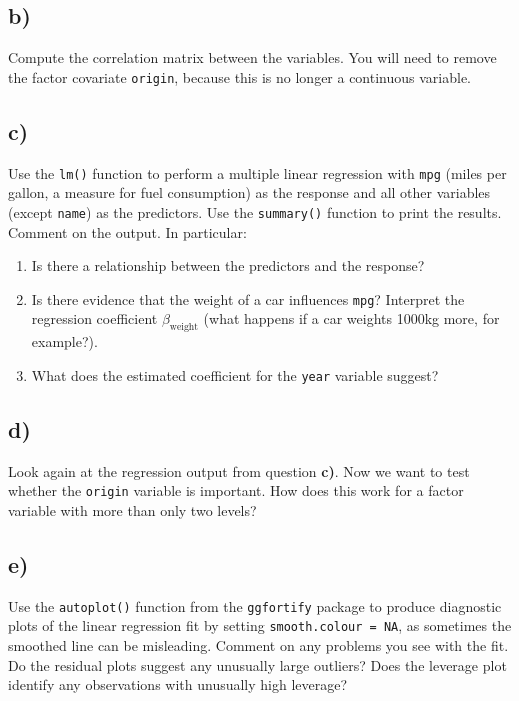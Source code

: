 \documentclass[
]{article}
\begin{document}
\subsection{b)}\label{b}

Compute the correlation matrix between the variables. You will need to
remove the factor covariate \texttt{origin}, because this is no longer a
continuous variable.

\subsection{c)}\label{c}

Use the \texttt{lm()} function to perform a multiple linear regression
with \texttt{mpg} (miles per gallon, a measure for fuel consumption) as
the response and all other variables (except \texttt{name}) as the
predictors. Use the \texttt{summary()} function to print the results.
Comment on the output. In particular:

\begin{enumerate}
\def\labelenumi{\roman{enumi}.}
\item
  Is there a relationship between the predictors and the response?
\item
  Is there evidence that the weight of a car influences \texttt{mpg}?
  Interpret the regression coefficient \(\beta_{\text{weight}}\) (what
  happens if a car weights 1000kg more, for example?).
\item
  What does the estimated coefficient for the \texttt{year} variable
  suggest?
\end{enumerate}

\subsection{d)}\label{d}

Look again at the regression output from question \textbf{c)}. Now we
want to test whether the \texttt{origin} variable is important. How does
this work for a factor variable with more than only two levels?

\subsection{e)}\label{e}

Use the \texttt{autoplot()} function from the \texttt{ggfortify} package
to produce diagnostic plots of the linear regression fit by setting
\texttt{smooth.colour\ =\ NA}, as sometimes the smoothed line can be
misleading. Comment on any problems you see with the fit. Do the
residual plots suggest any unusually large outliers? Does the leverage
plot identify any observations with unusually high leverage?
\end{document}
